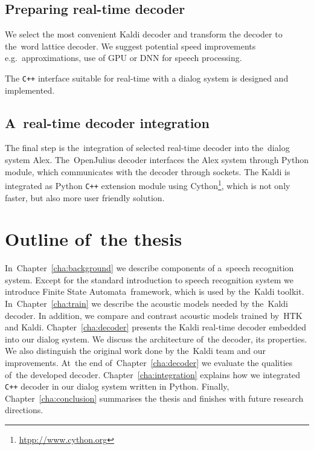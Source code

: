 \subsection{Preparing real-time decoder} 
\label{sub:compare_rt}

We select the most convenient Kaldi decoder and 
transform the decoder to the~word lattice decoder. 
We suggest potential speed improvements e.g.\ approximations, use of \ac{GPU} 
or \ac{DNN} for speech processing\cite{vesely2013sequencediscriminative}.

The \verb!C++! interface suitable for real-time with a dialog system is designed and implemented.

\subsection{A~real-time decoder integration} 
\label{sub:integration}
The final step is the~integration of selected real-time decoder into the~dialog system Alex.
The~OpenJulius decoder interfaces the Alex system through Python module, 
which communicates with the decoder through sockets.
The Kaldi is integrated as Python \verb!C++! extension module 
using Cython\footnote{\url{htpp://www.cython.org}}, 
which is not only faster, but also more user friendly solution.


\section{Outline of~the thesis} 
\label{sec:outline_of_the_thesis}
In~Chapter~\ref{cha:background} we describe components of a~speech recognition system.  
Except for the standard introduction to speech recognition system we introduce Finite State Automata~framework,
which is used by the~Kaldi toolkit. In~Chapter~\ref{cha:train} we describe the acoustic 
models needed by the~Kaldi decoder. 
In addition, we compare and contrast acoustic models trained by~\ac{HTK} and Kaldi. 
Chapter~\ref{cha:decoder} presents the Kaldi real-time decoder embedded into our dialog system.
We discuss the architecture of~the decoder, its properties. 
We also distinguish the original work done by the~Kaldi team and our improvements. 
At~the end of~Chapter~\ref{cha:decoder} 
we evaluate the qualities of~the developed decoder.
Chapter~\ref{cha:integration} explains how we integrated \verb!C++! decoder in our dialog system written in Python.
Finally, Chapter~\ref{cha:conclusion} summarises the thesis and finishes with future research directions.

